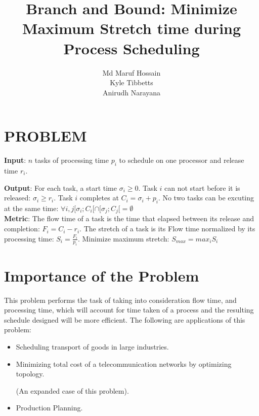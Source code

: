 \documentclass[11pt, conference, onecolumn]{IEEEtran}
\begin{document}
\title{Branch and Bound: Minimize Maximum Stretch time during Process Scheduling}

\author{
Md Maruf Hossain \\
Kyle Tibbetts \\
Anirudh Narayana \\
}

\maketitle
\section{PROBLEM}


\textbf{Input}: $n$ tasks of processing time $p_i$ to schedule on one processor and release time $r_i$. 


\textbf{Output}: For each task, a start time $\sigma_i \geq 0$. Task $i$ can not start before it is released: $\sigma_i \geq r_i$. Task $i$ completes at $C_i = \sigma_i + p_i$. No two tasks can be excuting at the same time: $\forall i,j [\sigma_i;C_i[ \cap [\sigma_j;C_j[ = \emptyset $ \\ 

\textbf{Metric}: The flow time of a task is the time that elapsed between its release and completion: $F_i = C_i - r_i$. The stretch of a task is its Flow time normalized by its processing time: $S_i = \frac{F_i}{p_i}$. Minimize maximum stretch: $S_{max} = max_i S_i$


\section{Importance of the Problem}

This problem performs the task of taking into consideration flow time, and processing time, which will account for time taken of a process and the resulting schedule designed will be more efficient. The following are applications of this problem:
\begin{itemize}
    \item Scheduling transport of goods in large industries.
    \item Minimizing total cost of a telecommunication networks by optimizing topology.
    
    (An expanded case of this problem).
    \item Production Planning.
\end{itemize}
\end{document}
